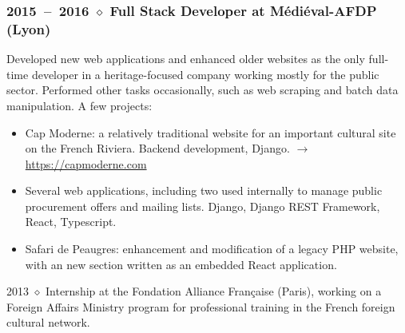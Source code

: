 \documentclass[10pt]{article}
\begin{document}
\begin{minipage}[t]{0.54\textwidth}
    \subsubsection*{2015~--~2016 $\diamond$ Full Stack Developer at Médiéval-AFDP (Lyon)}

    \vspace{-0.8em}

    Developed new web applications and enhanced older websites as the only
    full-time developer in a heritage-focused company working mostly for
    the public sector. Performed other tasks occasionally, such as web
    scraping and batch data manipulation. A few projects:
    \begin{itemize}
    \item
      Cap Moderne: a relatively traditional website for an important cultural site
      on the French Riviera. Backend development, Django. $\rightarrow$ \url{https://capmoderne.com}
    \item
      Several web applications, including two used internally to manage public
      procurement offers and mailing lists. Django, Django REST Framework,
      React, Typescript.
    \item
      Safari de Peaugres: enhancement and modification of a legacy PHP website,
      with an new section written as an embedded React application.
    \end{itemize}

  2013 $\diamond$ Internship at the Fondation Alliance Française (Paris), working on a
  Foreign Affairs Ministry program for professional training in the French
  foreign cultural network.
\end{minipage}
\hfill
\end{document}
